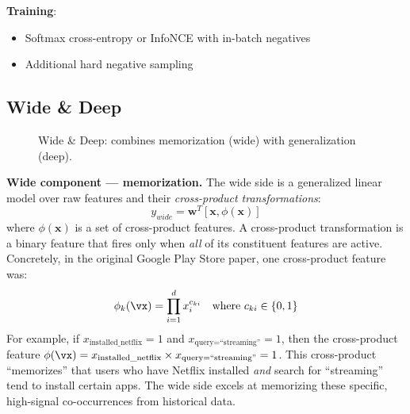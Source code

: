 \textbf{Training}:
\begin{itemize}
    \item Softmax cross-entropy or InfoNCE with in-batch negatives
    \item Additional hard negative sampling
\end{itemize}

\subsection{Wide \& Deep}

\begin{figure}[H]
\centering
{}
\caption{Wide \& Deep: combines memorization (wide) with generalization (deep).}
\end{figure}

\textbf{Wide component --- memorization.} The wide side is a generalized linear model over raw features and their \textit{cross-product transformations}:
\begin{equation}
y_{wide} = \mathbf{w}^T[\mathbf{x}, \phi(\mathbf{x})]
\end{equation}
where $\phi(\mathbf{x})$ is a set of cross-product features. A cross-product transformation is a binary feature that fires only when \textit{all} of its constituent features are active. Concretely, in the original Google Play Store paper, one cross-product feature was:
\[
\phi_k(\vx) = \prod_{i=1}^{d} x_i^{c_{ki}} \quad \text{where } c_{ki} \in \{0,1\}
\]
For example, if $x_{\text{installed\_netflix}} = 1$ and $x_{\text{query=``streaming''}} = 1$, then the cross-product feature $\phi(\vx) = x_{\text{installed\_netflix}} \times x_{\text{query=``streaming''}} = 1$. This cross-product ``memorizes'' that users who have Netflix installed \textit{and} search for ``streaming'' tend to install certain apps. The wide side excels at memorizing these specific, high-signal co-occurrences from historical data.

